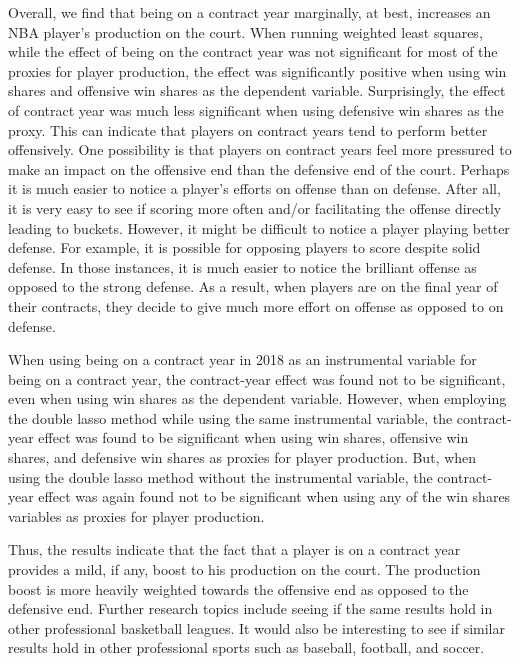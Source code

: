 \documentclass[12pt]{article}
\begin{document}
	Overall, we find that being on a contract year marginally, at best, increases an NBA player's production on the court. When running weighted least squares, while the effect of being on the contract year was not significant for most of the proxies for player production, the effect was significantly positive when using win shares and offensive win shares as the dependent variable. Surprisingly, the effect of contract year was much less significant when using defensive win shares as the proxy. This can indicate that players on contract years tend to perform better offensively. One possibility is that players on contract years feel more pressured to make an impact on the offensive end than the defensive end of the court. Perhaps it is much easier to notice a player's efforts on offense than on defense. After all, it is very easy to see if scoring more often and/or facilitating the offense directly leading to buckets. However, it might be difficult to notice a player playing better defense. For example, it is possible for opposing players to score despite solid defense. In those instances, it is much easier to notice the brilliant offense as opposed to the strong defense. As a result, when players are on the final year of their contracts, they decide to give much more effort on offense as opposed to on defense. 
	
	When using being on a contract year in 2018 as an instrumental variable for being on a contract year, the contract-year effect was found not to be significant, even when using win shares as the dependent variable. However, when employing the double lasso method while using the same instrumental variable, the contract-year effect was found to be significant when using win shares, offensive win shares, and defensive win shares as proxies for player production. But, when using the double lasso method without the instrumental variable, the contract-year effect was again found not to be significant when using any of the win shares variables as proxies for player production. 
	
	Thus, the results indicate that the fact that a player is on a contract year provides a mild, if any, boost to his production on the court. The production boost is more heavily weighted towards the offensive end as opposed to the defensive end. Further research topics include seeing if the same results hold in other professional basketball leagues. It would also be interesting to see if similar results hold in other professional sports such as baseball, football, and soccer. 
	
\end{document}
